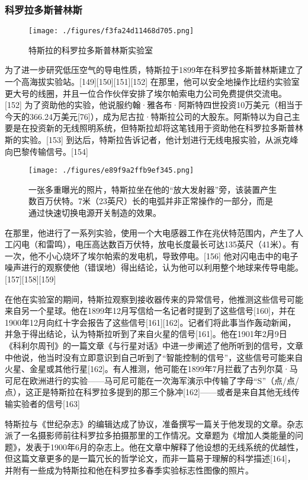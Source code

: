 \subsubsection{科罗拉多斯普林斯}
\begin{figure}[ht]
\centering
\texttt{[image: ./figures/f3fa24d11468d705.png]}
\caption{特斯拉的科罗拉多斯普林斯实验室} \label{fig_Tesla_12}
\end{figure}
为了进一步研究低压空气的导电性质，特斯拉于1899年在科罗拉多斯普林斯建立了一个高海拔实验站。[149][150][151][152] 在那里，他可以安全地操作比纽约实验室更大号的线圈，并且一位合作伙伴安排了埃尔帕索电力公司免费提供交流电。[152] 为了资助他的实验，他说服约翰·雅各布·阿斯特四世投资10万美元（相当于今天的366.24万美元[76]），成为尼古拉·特斯拉公司的大股东。阿斯特以为自己主要是在投资新的无线照明系统，但特斯拉却将这笔钱用于资助他在科罗拉多斯普林斯的实验。[153] 到达后，特斯拉告诉记者，他计划进行无线电报实验，从派克峰向巴黎传输信号。[154]
\begin{figure}[ht]
\centering
\texttt{[image: ./figures/e89f9a2ffb9ef345.png]}
\caption{一张多重曝光的照片，特斯拉坐在他的“放大发射器”旁，该装置产生数百万伏特。7米（23英尺）长的电弧并非正常操作的一部分，而是通过快速切换电源开关制造的效果。} \label{fig_Tesla_16}
\end{figure}
在那里，他进行了一系列实验，使用一个大电感器工作在兆伏特范围内，产生了人工闪电（和雷鸣），电压高达数百万伏特，放电长度最长可达135英尺（41米）。有一次，他不小心烧坏了埃尔帕索的发电机，导致停电。[156] 他对闪电击中的电子噪声进行的观察使他（错误地）得出结论，认为他可以利用整个地球来传导电能。[157][158][159]

在他在实验室的期间，特斯拉观察到接收器传来的异常信号，他推测这些信号可能来自另一个星球。他在1899年12月写信给一名记者时提到了这些信号[160]，并在1900年12月向红十字会报告了这些信号[161][162]。记者们将此事当作轰动新闻，并急于得出结论，认为特斯拉听到了来自火星的信号[161]。他在1901年2月9日《科利尔周刊》的一篇文章《与行星对话》中进一步阐述了他所听到的信号，文章中他说，他当时没有立即意识到自己听到了“智能控制的信号”，这些信号可能来自火星、金星或其他行星[162]。有人推测，他可能在1899年7月拦截了古列尔莫·马可尼在欧洲进行的实验——马可尼可能在一次海军演示中传输了字母“S”（点/点/点），这正是特斯拉在科罗拉多提到的那三个脉冲[162]——或者是来自其他无线传输实验者的信号[163]

特斯拉与《世纪杂志》的编辑达成了协议，准备撰写一篇关于他发现的文章。杂志派了一名摄影师前往科罗拉多拍摄那里的工作情况。文章题为《增加人类能量的问题》，发表于1900年6月的杂志上。他在文章中解释了他设想的无线系统的优越性，但这篇文章更多的是一篇冗长的哲学论文，而非一篇易于理解的科学描述[164]，并附有一些成为特斯拉和他在科罗拉多春季实验标志性图像的照片。
